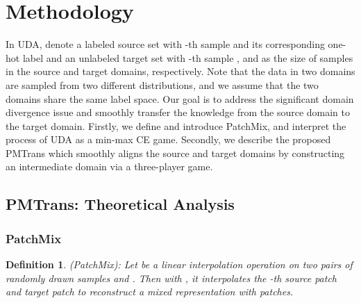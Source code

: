 \documentclass[10pt,twocolumn,letterpaper, ]{article}
\newtheorem{definition}{Definition}
\begin{document}
\vspace{-4pt}
\section{Methodology}\label{Methodology}
\vspace{-4pt}
In UDA, denote a labeled source set  with -th sample  and its corresponding one-hot label  and an unlabeled target set   with -th sample ,  and  as the size of samples in the source and target domains, respectively. Note that the data in two domains are sampled from two different distributions, and we assume that the two domains share the same label space. Our goal is to address the significant domain divergence issue and smoothly transfer the knowledge from the source domain to the target domain. Firstly, we define and introduce PatchMix, and interpret the process of UDA as a min-max CE game. Secondly, we describe the proposed PMTrans which smoothly aligns the source and target domains by constructing an intermediate domain via a three-player game. 
\subsection{PMTrans: Theoretical Analysis}
\label{sub:PMTrans}
\subsubsection{PatchMix}




\begin{definition}
\label{Def: Mixup}
(PatchMix): Let  be a linear interpolation operation on two pairs of randomly drawn samples  and . Then with , it interpolates the -th source patch  and target patch  to reconstruct a mixed representation with  patches.
\begin{small}

\end{small}
\end{definition}
\end{document}
